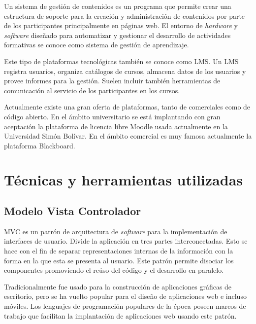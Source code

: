 Un sistema de gestión de contenidos es un programa que permite crear una estructura de soporte para la creación y administración de contenidos por parte de los participantes principalmente en páginas web. El entorno de \emph{hardware} y \emph{software} diseñado para automatizar y gestionar el desarrollo de actividades formativas se conoce como sistema de gestión de aprendizaje\cite{bib:lms}. 

Este tipo de plataformas tecnológicas también se conoce como \gls{LMS}. Un \gls{LMS} registra usuarios, organiza catálogos de cursos, almacena datos de los usuarios y provee informes para la gestión. Suelen incluir también herramientas de comunicación al servicio de los participantes en los cursos. 

Actualmente existe una gran oferta de plataformas, tanto de comerciales como de código abierto. En el ámbito universitario se está implantando con gran aceptación la plataforma de licencia libre Moodle\cite{bib:moodle} usada actualmente en la Universidad Simón Bolívar. En el ámbito comercial es muy famosa actualmente la plataforma Blackboard\cite{bib:blackboard}.

\section{Técnicas y herramientas utilizadas}

\subsection{Modelo Vista Controlador}

\gls{MVC} es un patrón de arquitectura de \emph{software} para la implementación de interfaces de usuario. Divide la aplicación en tres partes interconectadas. Esto se hace con el fin de separar representaciones internas de la información con la forma en la que esta se presenta al usuario. Este patrón permite disociar los componentes promoviendo el reúso del código y el desarrollo en paralelo\cite{bib:mvc}.

Tradicionalmente fue usado para la construcción de aplicaciones gráficas de escritorio, pero se ha vuelto popular para el diseño de aplicaciones web e incluso móviles. Los lenguajes de programación populares de la época poseen marcos de trabajo que facilitan la implantación de aplicaciones web usando este patrón.

